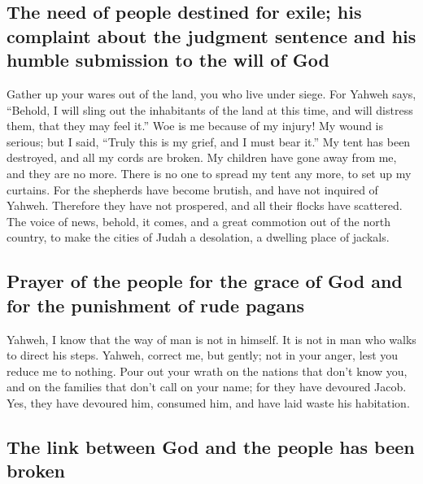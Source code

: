 \hypertarget{the-need-of-people-destined-for-exile-his-complaint-about-the-judgment-sentence-and-his-humble-submission-to-the-will-of-god}{%
\subsection{The need of people destined for exile; his complaint about
the judgment sentence and his humble submission to the will of
God}\label{the-need-of-people-destined-for-exile-his-complaint-about-the-judgment-sentence-and-his-humble-submission-to-the-will-of-god}}

 Gather up your wares out of the land, you who live under
siege.  For Yahweh says, ``Behold, I will sling out the
inhabitants of the land at this time, and will distress them, that they
may feel it.''  Woe is me because of my injury! My wound
is serious; but I said, ``Truly this is my grief, and I must bear it.''
 My tent has been destroyed, and all my cords are broken.
My children have gone away from me, and they are no more. There is no
one to spread my tent any more, to set up my curtains. 
For the shepherds have become brutish, and have not inquired of Yahweh.
Therefore they have not prospered, and all their flocks have scattered.
 The voice of news, behold, it comes, and a great
commotion out of the north country, to make the cities of Judah a
desolation, a dwelling place of jackals.

\hypertarget{prayer-of-the-people-for-the-grace-of-god-and-for-the-punishment-of-rude-pagans}{%
\subsection{Prayer of the people for the grace of God and for the
punishment of rude
pagans}\label{prayer-of-the-people-for-the-grace-of-god-and-for-the-punishment-of-rude-pagans}}

 Yahweh, I know that the way of man is not in himself. It
is not in man who walks to direct his steps.  Yahweh,
correct me, but gently; not in your anger, lest you reduce me to
nothing.  Pour out your wrath on the nations that don't
know you, and on the families that don't call on your name; for they
have devoured Jacob. Yes, they have devoured him, consumed him, and have
laid waste his habitation.

\hypertarget{the-link-between-god-and-the-people-has-been-broken}{%
\subsection{The link between God and the people has been
broken}\label{the-link-between-god-and-the-people-has-been-broken}}

